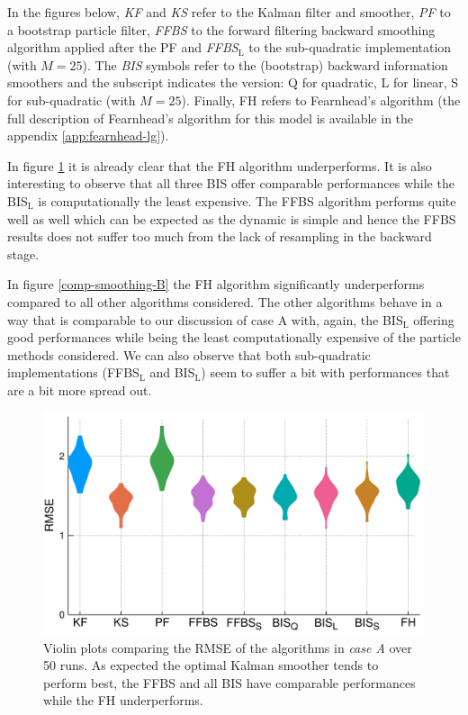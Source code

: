 In the figures below, \emph{KF} and \emph{KS} refer to the Kalman filter and smoother, \emph{PF} to a bootstrap particle filter, \emph{FFBS} to the forward filtering backward smoothing algorithm applied after the PF and \emph{FFBS$_{\text{L}}$} to the sub-quadratic implementation (with $M=25$). The \emph{BIS} symbols refer to the (bootstrap) backward information smoothers and the subscript indicates the version: Q for quadratic, L for linear, S for sub-quadratic (with $M=25$). Finally, FH refers to Fearnhead's algorithm (the full description of Fearnhead's algorithm for this model is available in the appendix \ref{app:fearnhead-lg}).

In figure \ref{comp-smoothing-A} it is already clear that the FH algorithm underperforms. It is also interesting to observe that all three BIS offer comparable performances while the BIS$_{\text{L}}$ is computationally the least expensive.
The FFBS algorithm performs quite well as well which can be expected as the dynamic is simple and hence the FFBS results does not suffer too much from the lack of resampling in the backward stage.

In figure \ref{comp-smoothing-B} the FH algorithm significantly underperforms compared to all other algorithms considered. The other algorithms behave in a way that is comparable to our discussion of case A with, again, the BIS$_{\text{L}}$ offering good performances while being the least computationally expensive of the particle methods considered. 
We can also observe that both sub-quadratic implementations (FFBS$_{\text{L}}$ and BIS$_{\text{L}}$) seem to suffer a bit with performances that are a bit more spread out. 


\begin{figure}[!h]
\center
\includegraphics[width=.75\textwidth]{figures/tfs/comparison_caseA}
\caption{\label{comp-smoothing-A}Violin plots comparing the RMSE of the algorithms in \emph{case A} over 50 runs. As expected the optimal Kalman smoother tends to perform best, the FFBS and all BIS have comparable performances while the FH underperforms.}
\end{figure}

